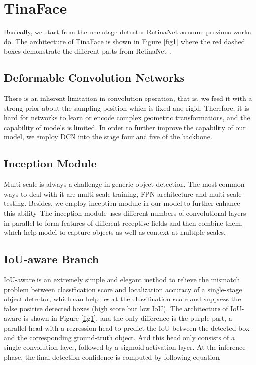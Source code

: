 \documentclass[final]{cvpr}
\begin{document}
\section{TinaFace}
\label{sec3}
Basically, we start from the one-stage detector RetinaNet \cite{lin2017focal} as some previous works do. The architecture of TinaFace is shown in Figure \ref{fig1} where the red dashed boxes demonstrate the different parts from RetinaNet \cite{lin2017focal}.

\subsection{Deformable Convolution Networks}
\label{sec3:sub1}
There is an inherent limitation in convolution operation, that is, we feed it with a strong prior about the sampling position which is fixed and rigid. Therefore, it is hard for networks to learn or encode complex geometric transformations, and the capability of models is limited. In order to further improve the capability of our model, we employ DCN \cite{dai2017deformable} into the stage four and five of the backbone.

\subsection{Inception Module}
\label{sec3:sub2}
Multi-scale is always a challenge in generic object detection. The most common ways to deal with it are multi-scale training, FPN architecture and multi-scale testing. Besides, we employ inception module \cite{szegedy2015going} in our model to further enhance this ability. The inception module uses different numbers of  convolutional layers in parallel to form features of different receptive fields and then combine them, which help model to capture objects as well as context at multiple scales.

\subsection{IoU-aware Branch}
\label{sec3:sub3}
IoU-aware \cite{wu2020iou} is an extremely simple and elegant method to relieve the mismatch problem between classification score and localization accuracy of a single-stage object detector, which can help resort the classification score and suppress the false positive detected boxes (high score but low IoU). The architecture of IoU-aware is shown in Figure \ref{fig1}, and the only difference is the purple part, a parallel head with a regression head to predict the IoU between the detected box and the corresponding ground-truth object. And this head only consists of a single  convolution layer, followed by a sigmoid activation layer. At the inference phase, the final detection confidence is computed by following equation,
\end{document}
